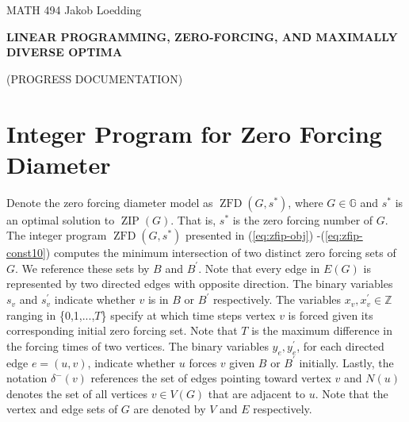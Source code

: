 \documentclass{article}
\newcommand\zip[1]{\operatorname{ZIP}\left(#1\right)}
\newcommand\zfd[1]{\operatorname{ZFD}\left(#1\right)}
\theoremstyle{definition}
\begin{document}
\noindent
{MATH 494}
\hfill
{
Jakob Loedding}

\vspace{.3 in}

\centerline{\large \bf  L{\small INEAR} P{\small ROGRAMMING,} Z{\small ERO-}F{\small ORCING,} {\small AND} M{\small AXIMALLY} D{\small IVERSE} O{\small PTIMA} }
\vspace{.1 in}
\centerline{\large  (P{\small ROGRESS} D{\small OCUMENTATION})}

\vspace{.2 in}

\section{Integer Program for Zero Forcing Diameter}\label{sec:intprog}
Denote the zero forcing diameter model as $\zfd{G,s^{*}}$, where $G \in \mathbb{G}$ and $s^{*}$ is an optimal solution to $\zip{G}$.
That is, $s^{*}$ is the zero forcing number of $G$.
The integer program $\zfd{G,s^{*}}$ presented in (\ref{eq:zfip-obj}) -(\ref{eq:zfip-const10}) computes the minimum intersection of two distinct zero forcing sets of $G$. We reference these sets by  $B$ and $B^{'}$.
Note that every edge in $E(G)$ is represented by two directed edges with opposite direction.
The binary variables $s_v$ and $s_v^{'}$ indicate whether $v$ is in $B$ or $B^{'}$ respectively.
The variables $x_v, x_v^{'} \in \mathbb{Z}$ ranging in \{0,1,...,$T$\} specify at which time steps vertex $v$ is forced given its corresponding initial zero forcing set.
Note that $T$ is the maximum difference in the forcing times of two vertices. 
The binary variables $y_e, y_e^{'}$,  for each directed edge $e = (u,v)$, indicate whether $u$ forces $v$ given $B$ or $B^{'}$ initially.
Lastly, the notation $\delta^{-}(v)$ references the set of edges pointing toward vertex $v$ and $N(u)$ denotes the set of all vertices $v \in V(G)$ that are adjacent to $u$. 
Note that the vertex and edge sets of $G$ are denoted by $V$ and $E$ respectively.
\end{document}
